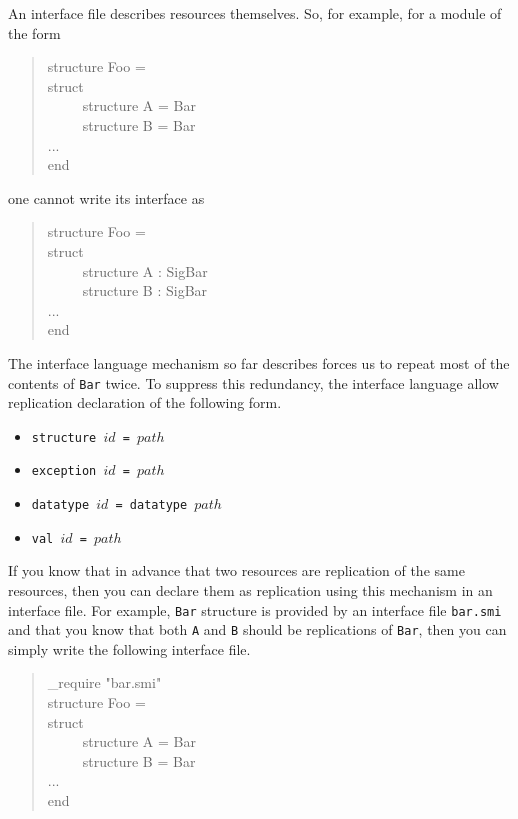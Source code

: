 \documentclass{jbook}
\newenvironment{program}{\begin{tt}\begin{quote}}{\end{quote}\end{tt}}
\newcommand{\myem}{\ \ \ \ \  }
\begin{document}
\else%
	An interface file describes resources themselves.
	So, for example, for a module of the form
\begin{program}
structure Foo = \\
struct\\
\myem structure A = Bar\\
\myem structure B = Bar\\
...\\
end

\end{program}
one cannot write its interface as
\begin{program}
structure Foo = \\
struct\\
\myem structure A : SigBar\\
\myem structure B : SigBar\\
...\\
end
\end{program}
	The interface language mechanism so far describes forces us to
repeat most of the contents of {\tt Bar} twice.
	To suppress this redundancy, the interface language allow
replication declaration of the following form.
\begin{itemize}
\item {\tt structure $id$ =  $path$}
\item {\tt exception $id$ = $path$}
\item {\tt datatype $id$ = datatype $path$}
\item {\tt val $id$ = $path$}
\end{itemize}
	If you know that in advance that two resources are replication of
the same resources, then you can declare them as replication using this
mechanism in an interface file.
	For example, {\tt Bar} structure is provided by an interface
file {\tt bar.smi} and that you know that both {\tt A} and {\tt B}
should be replications of {\tt Bar}, then you can simply write the
following interface file.
\begin{program}
\_require "bar.smi"\\
structure Foo = \\
struct\\
\myem structure A = Bar\\
\myem structure B = Bar\\
...\\
end
\end{program}
\fi%
\end{document}
